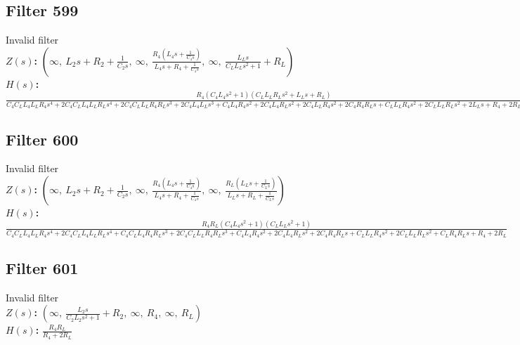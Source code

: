 \documentclass{article}
\begin{document}
\subsection*{Filter 599}
Invalid filter \\ 
\textbf{$Z(s)$:} $\left( \infty, \  L_{2} s + R_{2} + \frac{1}{C_{2} s}, \  \infty, \  \frac{R_{4} \left(L_{4} s + \frac{1}{C_{4} s}\right)}{L_{4} s + R_{4} + \frac{1}{C_{4} s}}, \  \infty, \  \frac{L_{L} s}{C_{L} L_{L} s^{2} + 1} + R_{L}\right)$ \\ 
\textbf{$H(s)$:} $\frac{R_{4} \left(C_{4} L_{4} s^{2} + 1\right) \left(C_{L} L_{L} R_{L} s^{2} + L_{L} s + R_{L}\right)}{C_{4} C_{L} L_{4} L_{L} R_{4} s^{4} + 2 C_{4} C_{L} L_{4} L_{L} R_{L} s^{4} + 2 C_{4} C_{L} L_{L} R_{4} R_{L} s^{3} + 2 C_{4} L_{4} L_{L} s^{3} + C_{4} L_{4} R_{4} s^{2} + 2 C_{4} L_{4} R_{L} s^{2} + 2 C_{4} L_{L} R_{4} s^{2} + 2 C_{4} R_{4} R_{L} s + C_{L} L_{L} R_{4} s^{2} + 2 C_{L} L_{L} R_{L} s^{2} + 2 L_{L} s + R_{4} + 2 R_{L}}$ \\ 
\subsection*{Filter 600}
Invalid filter \\ 
\textbf{$Z(s)$:} $\left( \infty, \  L_{2} s + R_{2} + \frac{1}{C_{2} s}, \  \infty, \  \frac{R_{4} \left(L_{4} s + \frac{1}{C_{4} s}\right)}{L_{4} s + R_{4} + \frac{1}{C_{4} s}}, \  \infty, \  \frac{R_{L} \left(L_{L} s + \frac{1}{C_{L} s}\right)}{L_{L} s + R_{L} + \frac{1}{C_{L} s}}\right)$ \\ 
\textbf{$H(s)$:} $\frac{R_{4} R_{L} \left(C_{4} L_{4} s^{2} + 1\right) \left(C_{L} L_{L} s^{2} + 1\right)}{C_{4} C_{L} L_{4} L_{L} R_{4} s^{4} + 2 C_{4} C_{L} L_{4} L_{L} R_{L} s^{4} + C_{4} C_{L} L_{4} R_{4} R_{L} s^{3} + 2 C_{4} C_{L} L_{L} R_{4} R_{L} s^{3} + C_{4} L_{4} R_{4} s^{2} + 2 C_{4} L_{4} R_{L} s^{2} + 2 C_{4} R_{4} R_{L} s + C_{L} L_{L} R_{4} s^{2} + 2 C_{L} L_{L} R_{L} s^{2} + C_{L} R_{4} R_{L} s + R_{4} + 2 R_{L}}$ \\ 
\subsection*{Filter 601}
Invalid filter \\ 
\textbf{$Z(s)$:} $\left( \infty, \  \frac{L_{2} s}{C_{2} L_{2} s^{2} + 1} + R_{2}, \  \infty, \  R_{4}, \  \infty, \  R_{L}\right)$ \\ 
\textbf{$H(s)$:} $\frac{R_{4} R_{L}}{R_{4} + 2 R_{L}}$ \\ 
\end{document}
